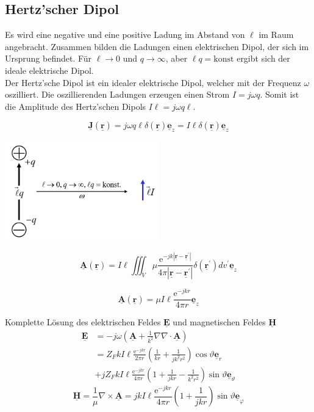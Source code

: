 \documentclass[english]{latex4ei/latex4ei_sheet}
\renewcommand{\vec}[1]{\underline{\boldsymbol{#1}}}
\begin{document}
\begin{sectionbox}
\subsection{Hertz'scher Dipol}
Es wird eine negative und eine positive Ladung im Abstand von $\ell$ 
im Raum angebracht. Zusammen bilden die Ladungen einen elektrischen Dipol, der sich im Ursprung befindet. Für $\ell \to 0$ und $q \to \infty$, aber $\ell q = \text{konst}$ ergibt sich der ideale elektrische Dipol.\\
Der Hertz'sche Dipol ist ein idealer elektrische Dipol, welcher mit der Frequenz $\omega$ oszilliert.
Die oszillierenden Ladungen erzeugen einen Strom $I=j\omega q$. Somit ist die Amplitude des  Hertz'schen Dipols $I\ell = j\omega q \ell$.

$$
\vec{J}(\vec{r})=j \omega q \ell \delta(\vec{r}) \vec{e}_{z}=I \ell \delta(\vec{r}) \vec{e}_{z}
$$
\begin{center}
	\includegraphics[width=0.5\textwidth]{./img/antennen_fritz_gerald.png}
\end{center}
$$
\vec{A}(\vec{r})=I \ell \iiint_{V} \mu \frac{\mathrm{e}^{-j k\left|\vec{r}-\vec{r}^{\prime}\right|}}{4 \pi\left|\vec{r}-\vec{r}^{\prime}\right|} \delta\left(\vec{r}^{\prime}\right) d v^{\prime} \vec{e}_{z}
$$
\begin{emphbox}
$$
\vec{A}(\vec{r})=\mu I \ell \frac{\mathrm{e}^{-j k r}}{4 \pi r} \vec{e}_{z}
$$
\end{emphbox}
Komplette Lösung des elektrischen Feldes $\vec{E}$ und magnetischen Feldes $\vec{H}$
$$
\begin{aligned}
	\vec{E} &=-j \omega\left(\vec{A}+\frac{1}{k^{2}} \nabla \nabla \cdot \vec{A}\right) \\
	&=Z_{F} k I \ell \frac{\mathrm{e}^{-j k r}}{2 \pi r}\left(\frac{1}{k r}+\frac{1}{j k^{2} r^{2}}\right) \cos \vartheta \vec{e}_{r}\\
	&+j Z_{F} k I \ell \frac{\mathrm{e}^{-j k r}}{4 \pi r}\left(1+\frac{1}{j k r}-\frac{1}{k^{2} r^{2}}\right) \sin \vartheta \vec{e}_{\vartheta}
\end{aligned}
$$
$$
\vec{H}=\frac{1}{\mu} \nabla \times \vec{A}=j k I \ell \frac{\mathrm{e}^{-j k r}}{4 \pi r}\left(1+\frac{1}{j k r}\right) \sin \vartheta \vec{e}_{\varphi}
$$
\end{sectionbox}
\end{document}
